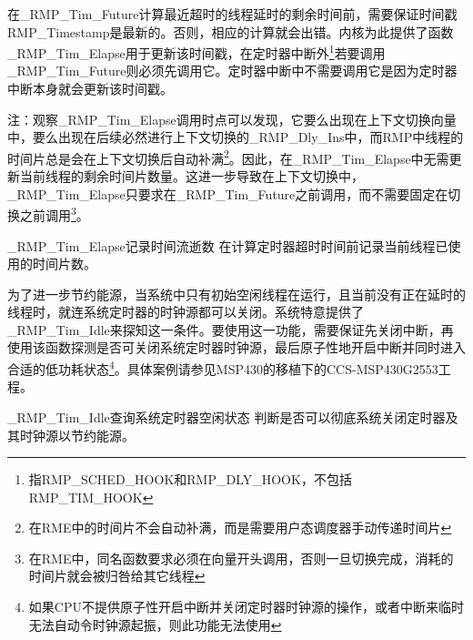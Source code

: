 在\_RMP\_Tim\_Future计算最近超时的线程延时的剩余时间前，需要保证时间戳RMP\_Timestamp是最新的。否则，相应的计算就会出错。内核为此提供了函数\_RMP\_Tim\_Elapse用于更新该时间戳，在定时器中断外\footnote{指RMP\_SCHED\_HOOK和RMP\_DLY\_HOOK，不包括RMP\_TIM\_HOOK}若要调用\_RMP\_Tim\_Future则必须先调用它。定时器中断中不需要调用它是因为定时器中断本身就会更新该时间戳。

注：观察\_RMP\_Tim\_Elapse调用时点可以发现，它要么出现在上下文切换向量中，要么出现在后续必然进行上下文切换的\_RMP\_Dly\_Ins中，而RMP中线程的时间片总是会在上下文切换后自动补满\footnote{在RME中的时间片不会自动补满，而是需要用户态调度器手动传递时间片}。因此，在\_RMP\_Tim\_Elapse中无需更新当前线程的剩余时间片数量。这进一步导致在上下文切换中，\_RMP\_Tim\_Elapse只要求在\_RMP\_Tim\_Future之前调用，而不需要固定在切换之前调用\footnote{在RME中，同名函数要求必须在向量开头调用，否则一旦切换完成，消耗的时间片就会被归咎给其它线程}。

\begin{apidesc}{\_RMP\_Tim\_Elapse}{记录时间流逝数}
    在计算定时器超时时间前记录当前线程已使用的时间片数。
    \begin{apiparams}
    \end{apiparams}
    \begin{apiret}
    \end{apiret}
\end{apidesc}

为了进一步节约能源，当系统中只有初始空闲线程在运行，且当前没有正在延时的线程时，就连系统定时器的时钟源都可以关闭。系统特意提供了\_RMP\_Tim\_Idle来探知这一条件。要使用这一功能，需要保证先关闭中断，再使用该函数探测是否可关闭系统定时器时钟源，最后原子性地开启中断并同时进入合适的低功耗状态\footnote{如果CPU不提供原子性开启中断并关闭定时器时钟源的操作，或者中断来临时无法自动令时钟源起振，则此功能无法使用}。具体案例请参见MSP430的移植下的CCS-MSP430G2553工程。

\begin{apidesc}{\_RMP\_Tim\_Idle}{查询系统定时器空闲状态}
    判断是否可以彻底系统关闭定时器及其时钟源以节约能源。
    \begin{apiparams}
    \end{apiparams}
    \begin{apiret}
    \end{apiret}
\end{apidesc}

